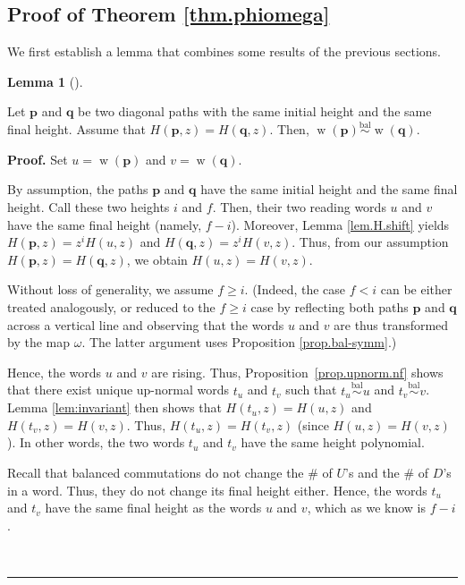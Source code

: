 \documentclass[numbers=enddot,12pt,final,onecolumn,notitlepage]{scrartcl}%
\theoremstyle{definition}
\newtheorem{lem}[theo]{Lemma}
\newenvironment{lemma}[1][]
{\begin{lem}[#1]\begin{leftbar}}
{\end{leftbar}\end{lem}}
\newenvironment{proof}[1][Proof]{\noindent\textbf{#1.} }{\ \rule{0.5em}{0.5em}}
\newcommand{\pp}{\mathbf{p}}
\newcommand{\qq}{\mathbf{q}}
\newcommand{\w}{\operatorname{w}}
\newcommand{\balsim}{\overset{\operatorname*{bal}}{\sim}}
\newcommand{\tup}[1]{\left( #1 \right)}
\newenvironment{vershort}{}{}
\begin{document}
\begin{vershort}
\subsection{Proof of Theorem \ref{thm.phiomega}}
We first establish a lemma that combines some results of the previous sections.

\begin{lemma}
\label{lem.4to5}
Let $\pp$ and $\qq$ be two diagonal paths with
the same initial height and the same final height. Assume that $H\left(
\pp,z\right)  =H\left(  \qq,z\right)  $. Then,
$\w\tup{\pp} \balsim \w\tup{\qq}$.
\end{lemma}

\begin{proof}
Set $u=\w\left(  \pp\right)  $ and $v=\w%
\left(  \qq\right)  $.

By assumption, the paths $\pp$ and $\qq$ have the same initial
height and the same final height. Call these two heights $i$ and $f$.
Then, their two reading words $u$ and $v$ have the same final height
(namely, $f-i$).
Moreover, Lemma \ref{lem.H.shift} yields
$H\tup{\pp, z} = z^i H\tup{u, z}$ and $H\tup{\qq, z} = z^i H\tup{v, z}$.
Thus, from our assumption $H\tup{\pp, z} = H\tup{\qq, z}$,
we obtain $H\tup{u, z} = H\tup{v, z}$.

Without loss of generality, we assume $f\geq i$.
(Indeed, the case $f<i$ can be either treated analogously, or
reduced to the $f \geq i$ case by reflecting both paths $\pp$ and $\qq$ across
a vertical line and observing that the words $u$ and $v$ are thus transformed by
the map $\omega$.
The latter argument uses Proposition \ref{prop.bal-symm}.)

Hence, the words $u$ and $v$ are rising.
Thus, Proposition~\ref{prop.upnorm.nf} shows that there exist unique up-normal words
$t_{u}$ and $t_{v}$ such that $t_{u} \balsim u$ and
$t_{v} \balsim v$. Lemma \ref{lem:invariant} then shows that $H\left(  t_{u},z\right)
=H\left(  u,z\right)  $
and $H\left(  t_{v},z\right)  =H\left(  v,z\right)  $.
Thus, $H\tup{t_u, z} = H\tup{t_v, z}$
(since $H\tup{u, z} = H\tup{v, z}$).
In other words, the two words $t_u$ and $t_v$ have the same
height polynomial.

Recall that balanced commutations do not change the \# of
$U$'s and the \# of $D$'s in a word. Thus, they do not change
its final height either. Hence, the words $t_u$ and $t_v$
have the same final height as the words $u$ and $v$, which as we know is $f-i$.


\end{proof}
\end{vershort}
\end{document}
